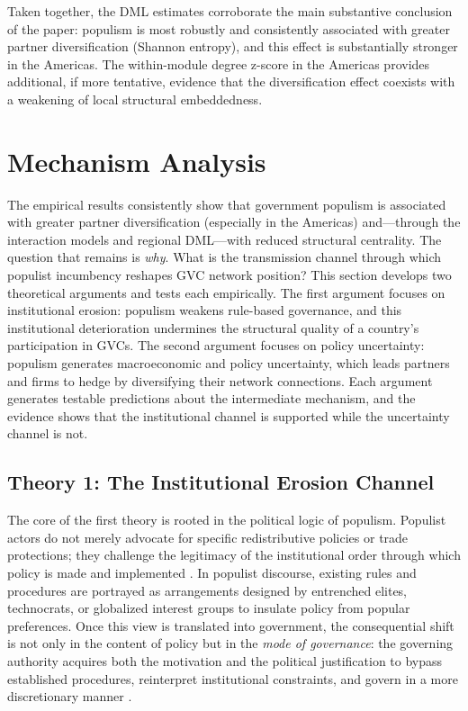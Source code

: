 \documentclass[12pt]{article}
\begin{document}
Taken together, the DML estimates corroborate the main substantive conclusion of the paper: populism is most robustly and consistently associated with greater partner diversification (Shannon entropy), and this effect is substantially stronger in the Americas. The within-module degree z-score in the Americas provides additional, if more tentative, evidence that the diversification effect coexists with a weakening of local structural embeddedness.



\section{Mechanism Analysis}

The empirical results consistently show that government populism is associated with greater partner diversification (especially in the Americas) and---through the interaction models and regional DML---with reduced structural centrality. The question that remains is \textit{why}. What is the transmission channel through which populist incumbency reshapes GVC network position? This section develops two theoretical arguments and tests each empirically. The first argument focuses on institutional erosion: populism weakens rule-based governance, and this institutional deterioration undermines the structural quality of a country's participation in GVCs. The second argument focuses on policy uncertainty: populism generates macroeconomic and policy uncertainty, which leads partners and firms to hedge by diversifying their network connections. Each argument generates testable predictions about the intermediate mechanism, and the evidence shows that the institutional channel is supported while the uncertainty channel is not.

\subsection{Theory 1: The Institutional Erosion Channel}

The core of the first theory is rooted in the political logic of populism. Populist actors do not merely advocate for specific redistributive policies or trade protections; they challenge the legitimacy of the institutional order through which policy is made and implemented \citep{mudde2004, laclau2005, weyland2001}. In populist discourse, existing rules and procedures are portrayed as arrangements designed by entrenched elites, technocrats, or globalized interest groups to insulate policy from popular preferences. Once this view is translated into government, the consequential shift is not only in the content of policy but in the \textit{mode of governance}: the governing authority acquires both the motivation and the political justification to bypass established procedures, reinterpret institutional constraints, and govern in a more discretionary manner \citep{funke2016, funke2020, levitskyloxton2013, bermeo2016}.
\end{document}
